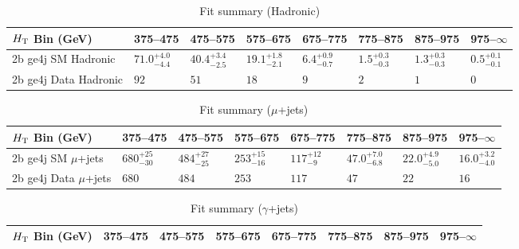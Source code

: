 \documentclass[8pt]{article}
\def\scalht{\mbox{$H_{\rm{T}}$}\xspace}
\newcommand\T{\rule{0pt}{2.6ex}}
\begin{document}
\begin{table}[ht!]
\caption{Fit summary (Hadronic)}
\label{tab:ensemble-summary}
\centering
\begin{tabular}{ llllllll }

\hline
\scalht Bin (GeV)       & 375--475                       & 475--575                       & 575--675                       & 675--775                       & 775--875                       & 875--975                       & 975--$\infty$                  \\ [1.000000ex]
\hline
2b ge4j SM Hadronic\T   & $71.0^{+4.0}_{-4.4}$           & $40.4^{+3.4}_{-2.5}$           & $19.1^{+1.8}_{-2.1}$           & $6.4^{+0.9}_{-0.7}$            & $1.5^{+0.3}_{-0.3}$            & $1.3^{+0.3}_{-0.3}$            & $0.5^{+0.1}_{-0.1}$            \\ 
2b ge4j Data Hadronic\T & $92$                           & $51$                           & $18$                           & $9$                            & $2$                            & $1$                            & $0$                            \\ 
\hline

\end{tabular}
\end{table}
\begin{table}[ht!]
\caption{Fit summary ($\mu$+jets)}
\label{tab:ensemble-summary}
\centering
\begin{tabular}{ llllllll }

\hline
\scalht Bin (GeV)       & 375--475                       & 475--575                       & 575--675                       & 675--775                       & 775--875                       & 875--975                       & 975--$\infty$                  \\ [1.000000ex]
\hline
2b ge4j SM $\mu$+jets\T & $680^{+25}_{-30}$              & $484^{+27}_{-25}$              & $253^{+15}_{-16}$              & $117^{+12}_{-9}$               & $47.0^{+7.0}_{-6.8}$           & $22.0^{+4.9}_{-5.0}$           & $16.0^{+3.2}_{-4.0}$           \\ 
2b ge4j Data $\mu$+jets\T & $680$                          & $484$                          & $253$                          & $117$                          & $47$                           & $22$                           & $16$                           \\ 
\hline

\end{tabular}
\end{table}
\begin{table}[ht!]
\caption{Fit summary ($\gamma$+jets)}
\label{tab:ensemble-summary}
\centering
\begin{tabular}{ llllllll }

\hline
\scalht Bin (GeV)       & 375--475                       & 475--575                       & 575--675                       & 675--775                       & 775--875                       & 875--975                       & 975--$\infty$                  \\ [1.000000ex]
\hline

\end{tabular}
\end{table}
\end{document}
